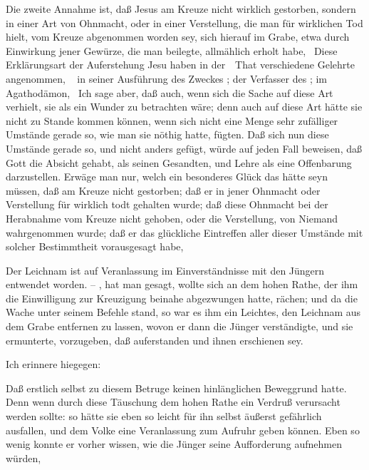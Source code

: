 \begin{aufza}
\begin{aufzb}
\begin{aufzc}
\item Die zweite Annahme ist, daß Jesus am Kreuze nicht wirklich gestorben, sondern in einer Art von Ohnmacht, oder in einer Verstellung, die man für wirklichen Tod hielt, vom Kreuze abgenommen worden sey, sich hierauf im Grabe, etwa durch Einwirkung jener Gewürze, die man beilegte, allmählich erholt habe, \usw\ Diese Erklärungsart der Auferstehung Jesu haben in der~\ That verschiedene Gelehrte angenommen, \zB\  in seiner Ausführung des Zweckes ; der Verfasser des ;  im Agathodämon, \umA\  Ich sage aber, daß auch, wenn sich die Sache auf diese Art verhielt, sie als ein Wunder zu betrachten wäre; denn auch auf diese Art hätte sie nicht zu Stande kommen können, wenn sich nicht eine Menge sehr zufälliger Umstände gerade so, wie man sie nöthig hatte, fügten. Daß sich nun diese Umstände gerade so, und nicht anders gefügt, würde auf jeden Fall beweisen, daß Gott die Absicht gehabt,  als seinen Gesandten, und  Lehre als eine Offenbarung darzustellen. Erwäge man nur, welch ein besonderes Glück das hätte seyn müssen, daß  am Kreuze nicht gestorben; daß er in jener Ohnmacht oder Verstellung für wirklich todt gehalten wurde; daß diese Ohnmacht bei der Herabnahme vom Kreuze nicht gehoben, oder die Verstellung, von Niemand wahrgenommen wurde; daß er das glückliche Eintreffen aller dieser Umstände mit solcher Bestimmtheit vorausgesagt habe, \usw\
\end{aufzc}
\item Der Leichnam  ist auf Veranlassung  im Einverständnisse mit den Jüngern entwendet worden. -- , hat man gesagt, wollte sich an dem hohen Rathe, der ihm die Einwilligung zur Kreuzigung  beinahe abgezwungen hatte, rächen; und da die Wache unter seinem Befehle stand, so war es ihm ein Leichtes, den Leichnam aus dem Grabe entfernen zu lassen, wovon er dann die Jünger verständigte, und sie ermunterte, vorzugeben, daß  auferstanden und ihnen erschienen sey. \par
Ich erinnere hiegegen:
\begin{aufzc}
\item Daß erstlich  selbst zu diesem Betruge keinen hinlänglichen Beweggrund hatte. Denn wenn durch diese Täuschung dem hohen Rathe ein Verdruß verursacht werden sollte: so hätte sie eben so leicht für ihn selbst äußerst gefährlich ausfallen, und dem Volke eine Veranlassung zum Aufruhr geben können. Eben so wenig konnte er vorher wissen, wie die Jünger seine Aufforderung aufnehmen würden, \usw~

\end{aufzc}
\end{aufzb}
\end{aufza}

